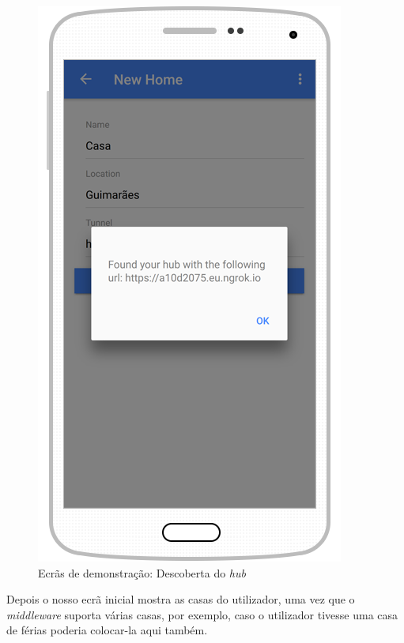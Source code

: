 \begin{figure}[H]
  \centering
        \includegraphics[scale=0.75]{img/demo/create_home_find_hub.png}
  \caption{Ecrãs de demonstração: Descoberta do \textit{hub}}
\end{figure}

Depois o nosso ecrã inicial mostra as casas do utilizador, uma vez que o \textit{middleware} suporta várias casas, por exemplo, caso o utilizador tivesse uma casa de férias poderia colocar-la aqui também.

